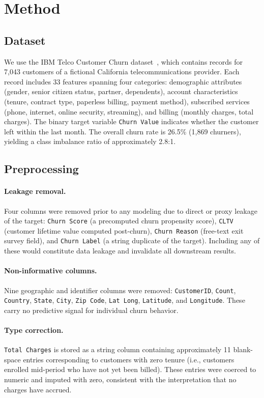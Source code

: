 \documentclass{article}
\begin{document}
\section{Method}

\subsection{Dataset}

We use the IBM Telco Customer Churn dataset~\citep{ibmTelco2019}, which contains
records for 7,043 customers of a fictional California telecommunications provider.
Each record includes 33 features spanning four categories: demographic attributes
(gender, senior citizen status, partner, dependents), account characteristics
(tenure, contract type, paperless billing, payment method), subscribed services
(phone, internet, online security, streaming), and billing (monthly charges, total charges).
The binary target variable \texttt{Churn Value} indicates whether the customer left
within the last month. The overall churn rate is 26.5\% (1,869 churners),
yielding a class imbalance ratio of approximately 2.8:1.

\subsection{Preprocessing}

\paragraph{Leakage removal.}
Four columns were removed prior to any modeling due to direct or proxy leakage of the
target: \texttt{Churn Score} (a precomputed churn propensity score), \texttt{CLTV}
(customer lifetime value computed post-churn), \texttt{Churn Reason} (free-text
exit survey field), and \texttt{Churn Label} (a string duplicate of the target).
Including any of these would constitute data leakage and invalidate all downstream results.

\paragraph{Non-informative columns.}
Nine geographic and identifier columns were removed: \texttt{CustomerID},
\texttt{Count}, \texttt{Country}, \texttt{State}, \texttt{City}, \texttt{Zip Code},
\texttt{Lat Long}, \texttt{Latitude}, and \texttt{Longitude}. These carry no
predictive signal for individual churn behavior.

\paragraph{Type correction.}
\texttt{Total Charges} is stored as a string column containing approximately 11
blank-space entries corresponding to customers with zero tenure (i.e., customers
enrolled mid-period who have not yet been billed). These entries were coerced to
numeric and imputed with zero, consistent with the interpretation that no charges
have accrued.
\end{document}
